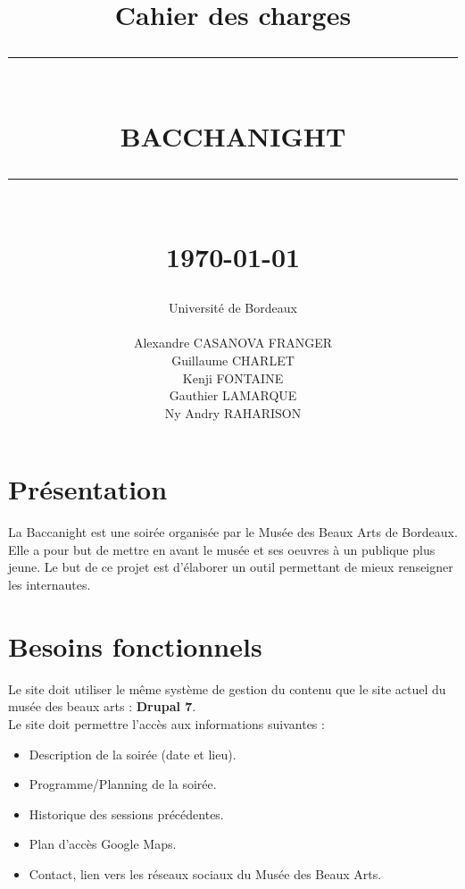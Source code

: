 \documentclass[11pt]{report}
\newcommand{\HRule}[1]{\rule{\linewidth}{#1}}
\renewcommand{\thesection}{\arabic{section}}
\begin{document}
\title
{
	\Large{Cahier des charges}
	\HRule{2pt} \\ [0.5cm]
	\LARGE \textbf{\uppercase{Bacchanight}}
	\HRule{2pt} \\ [0.5cm]
	\normalsize \today
}

\date{}

\author
{
	\LARGE{Université de Bordeaux} \\
	\\
	Alexandre CASANOVA FRANGER \\
	Guillaume CHARLET \\
    Kenji FONTAINE \\
    Gauthier LAMARQUE \\
	Ny Andry RAHARISON \\
}

\maketitle


\renewcommand{\thesection}{\arabic{section}}

\section{Présentation}

La Baccanight est une soirée organisée par le Musée des Beaux Arts de Bordeaux.
Elle a pour but de mettre en avant le musée et ses oeuvres à un publique plus jeune.
Le but de ce projet est d'élaborer un outil permettant de mieux renseigner les internautes.

\section{Besoins fonctionnels}

Le site doit utiliser le même système de gestion du contenu que le site actuel
du musée des beaux arts : \textbf{Drupal 7}. \\

Le site doit permettre l'accès aux informations suivantes :
\begin{itemize}
	\item Description de la soirée (date et lieu).
	\item Programme/Planning de la soirée.
	\item Historique des sessions précédentes.
	\item Plan d'accès Google Maps.
	\item Contact, lien vers les réseaux sociaux du Musée des Beaux Arts.
\end{itemize}
\end{document}
